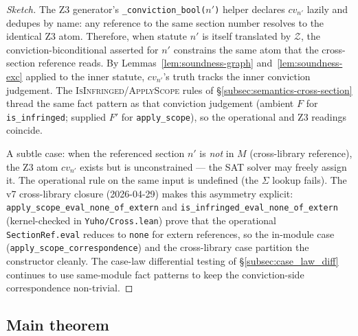 \begin{proof}[Sketch]
The Z3 generator's \texttt{\_conviction\_bool($n'$)} helper
declares $\mathit{cv}_{n'}$ lazily and dedupes by name: any
reference to the same section number resolves to the identical
Z3 atom. Therefore, when statute $n'$ is itself translated by
$\mathcal{Z}$, the conviction-biconditional asserted for $n'$
constrains the same atom that the cross-section reference reads.
By Lemmas~\ref{lem:soundness-graph} and~\ref{lem:soundness-exc}
applied to the inner statute, $\mathit{cv}_{n'}$'s truth tracks
the inner conviction judgement. The
\textsc{IsInfringed}/\textsc{ApplyScope} rules of
\S\ref{subsec:semantics-cross-section} thread the same fact
pattern as that conviction judgement (ambient $F$ for
\texttt{is\_infringed}; supplied $F'$ for \texttt{apply\_scope}),
so the operational and Z3 readings coincide.

A subtle case: when the referenced section $n'$ is \emph{not}
in $M$ (cross-library reference), the Z3 atom $\mathit{cv}_{n'}$
exists but is unconstrained --- the SAT solver may freely
assign it. The operational rule on the same input is undefined
(the $\Sigma$ lookup fails). The v7 cross-library closure
(2026-04-29) makes this asymmetry explicit:
\texttt{apply\_scope\_eval\_none\_of\_extern} and
\texttt{is\_infringed\_eval\_none\_of\_extern} (kernel-checked
in \texttt{Yuho/Cross.lean}) prove that the operational
\texttt{SectionRef.eval} reduces to \texttt{none} for extern
references, so the in-module case
(\texttt{apply\_scope\_correspondence}) and the cross-library
case partition the constructor cleanly. The case-law
differential testing of \S\ref{subsec:case_law_diff} continues
to use same-module fact patterns to keep the conviction-side
correspondence non-trivial.
\end{proof}

\subsection{Main theorem}
\label{subsec:soundness-main}

